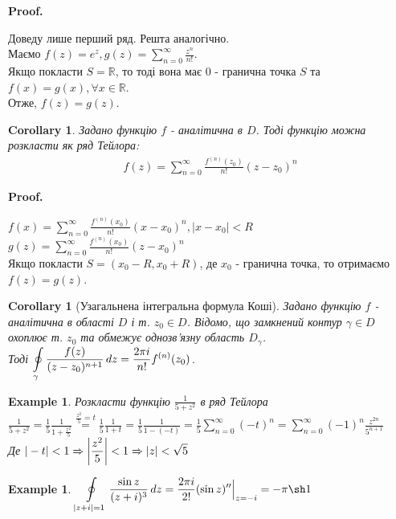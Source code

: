 \documentclass[a4paper, 10pt]{article}
\makeatletter
\def\qed{$\blacksquare$}
\theoremstyle{theoremdd}
\theoremstyle{theoremdd}
\theoremstyle{theoremdd}
\theoremstyle{theoremdd}
\newtheorem{example}[theorem]{Example}
\theoremstyle{theoremdd}
\theoremstyle{theoremdd}
\theoremstyle{theoremdd}
\theoremstyle{theoremdd}
\newtheorem{corollary}[theorem]{Corollary}
\renewenvironment{proof}[1][Proof.\\]{\par
\pushQED{\hfill \qed}%
\normalfont \topsep6\p@\@plus6\p@\relax
\trivlist
\item\relax
{\bfseries
#1\@addpunct{.}}\hspace\labelsep\ignorespaces
}{%
\popQED\endtrivlist\@endpefalse
}
\makeatother
\begin{document}
\begin{proof}
Доведу лише перший ряд. Решта аналогічно.\\
Маємо $f(z) = e^z, g(z)=\displaystyle \sum_{n=0}^{\infty} \frac{z^n}{n!}$.\\
Якщо покласти $S=\mathbb{R}$, то тоді вона має $0$ - гранична точка $S$ та $f(x)=g(x), \forall x \in \mathbb{R}$.\\
	Отже, $f(z)=g(z)$.
\end{proof}

\begin{corollary}
Задано функцію $f$ - аналітична в $D$. Тоді функцію можна розкласти як ряд Тейлора:
\begin{align*}
	f(z) = \sum_{n=0}^{\infty} \frac{f^{(n)}(z_0)}{n!} (z-z_0)^n
\end{align*}
\end{corollary}

\begin{proof}
$f(x)=\displaystyle \sum_{n=0}^{\infty} \frac{f^{(n)}(x_0)}{n!} (x-x_0)^n, |x-x_0|<R$\\ $\displaystyle g(z)=\sum_{n=0}^{\infty} \frac{f^{(n)}(x_0)}{n!} (z-x_0)^n$\\
	Якщо покласти $S=(x_0-R, x_0+R)$, де $x_0$ - гранична точка, то отримаємо $f(z)=g(z)$. 
\end{proof}

\begin{corollary}[Узагальнена інтегральна формула Коші]
Задано функцію $f$ - аналітична в області $D$ і т. $z_0 \in D$. Відомо, що замкнений контур $\gamma \in D$ охоплює т. $z_0$ та обмежує однозв'язну область $D_{\gamma}$. \\
Тоді $\displaystyle\oint\displaylimits_{\gamma} \frac{f(z)}{(z-z_0)^{n+1}}\,dz = \frac{2 \pi i}{n!} f^{(n)}(z_0)$.
\end{corollary}

\begin{example}
Розкласти функцію $\displaystyle \frac{1}{5+z^2}$ в ряд Тейлора\\
	$\displaystyle \frac{1}{5+z^2} = \frac{1}{5} \frac{1}{1 + \frac{z^2}{5}} \overset{\textstyle \frac{z^2}{5} = t}{=} \frac{1}{5} \frac{1}{1+t} = \frac{1}{5} \frac{1}{1-(-t)} = \frac{1}{5} \sum_{n=0}^{\infty} (-t)^n = \sum_{n=0}^{\infty} (-1)^n \frac{z^{2n}}{5^{n+1}}$\\
	Де $\displaystyle |-t|<1 \Rightarrow \abs{\frac{z^2}{5}} < 1 \Rightarrow |z| < \sqrt{5}$
\end{example}

\begin{example}
$\displaystyle \oint\displaylimits_{|z+i|=1} \frac{\sin z}{(z+i)^3} \,dz = \frac{2\pi i}{2!} (\sin z)'' \Big|_{z=-i} = -\pi \sh 1$
\end{example}
\end{document}
